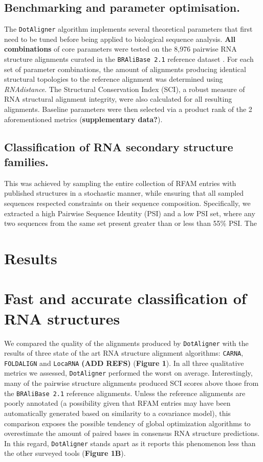 \documentclass[a4paper,11pt]{article}
\newcommand\dotaligner{\texttt{DotAligner}}
\newcommand\bralibase{\texttt{BRAliBase 2.1}}
\newcommand\locarna{\texttt{LocaRNA}}
\newcommand\foldalign{\texttt{FOLDALIGN}}
\newcommand\carna{\texttt{CARNA}}
\begin{document}
\subsection{ Benchmarking and parameter optimisation. }

The \dotaligner{} algorithm implements several theoretical parameters that first need to 
be tuned before being applied to biological sequence analysis.\textbf{ All combinations} of 
core parameters were tested on the 8,976 pairwise RNA structure alignments curated in the 
\bralibase{} reference dataset \cite{Wilm2006enhanced}. For each set of parameter combinations, 
the amount of alignments producing identical structural topologies to the reference alignment
was determined using \textit{RNAdistance}. The Structural Conservation Index (SCI), a robust 
measure of RNA structural alignment integrity, were  also calculated for all resulting alignments. 
Baseline parameters were then selected via a product rank of the 2 aforementioned metrics 
(\textbf{supplementary data?}).\\

\subsection{ Classification of RNA secondary structure families. }


This was achieved by sampling the entire collection of RFAM entries with published structures 
in a stochastic manner, while ensuring that all sampled sequences respected constraints 
on their sequence composition. Specifically, we extracted a high Pairwise Sequence Identity (PSI) 
and a low PSI set, where any two sequences from the same set present greater than or less than 
55\% PSI. The 


\section{ Results }
\section*{ Fast and accurate classification of RNA structures  } 
We compared the quality of the alignments produced by \dotaligner{} with the results of
three state of the art RNA structure alignment algorithms: \carna{}, \foldalign{} and \locarna{} \textbf{(ADD REFS)}
(\textbf{Figure 1}). In all three qualitative metrics we assessed,  \dotaligner{} performed the 
worst on average. Interestingly, many of the pairwise structure alignments produced 
SCI scores above those from the \bralibase{} reference alignments. Unless the reference
alignments are poorly annotated (a possibility given that RFAM entries may have been automatically 
generated based on similarity to a covariance model), this comparison exposes the possible 
tendency of global optimization algorithms to overestimate the amount of paired bases in 
consensus RNA structure predictions. In this regard, \dotaligner{} stands apart as it reports this 
phenomenon less than the other surveyed tools (\textbf{Figure 1B}). 
\end{document}
